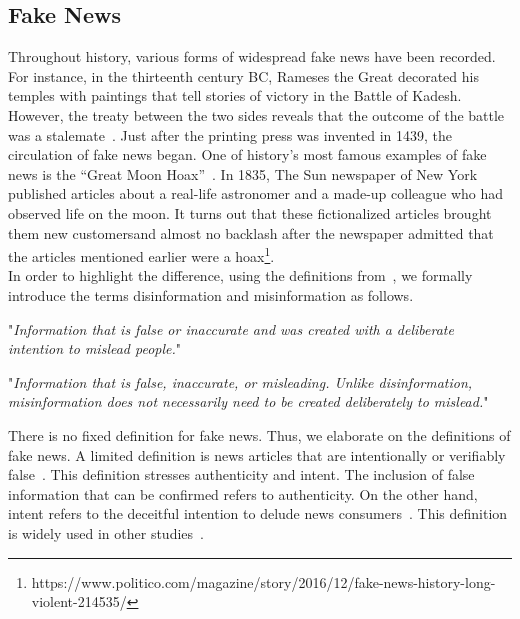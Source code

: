\subsection{Fake News}
\label{subsec:fakeNewsDetection_fakeNews}
Throughout history, various forms of widespread fake news have been recorded. For instance, in the thirteenth century BC, Rameses the Great decorated his temples with paintings that tell stories of victory in the Battle of Kadesh. However, the treaty between the two sides reveals
that the outcome of the battle was a stalemate~\parencite{HistorysGreatestLies_Weir}. Just after the printing press was invented in 1439,
the circulation of fake news began. One of history's most famous examples of fake news is the
“Great Moon Hoax”~\parencite{TheGreatMoonHoax_Foster}. In 1835, The Sun newspaper of New York published articles about a real-life astronomer and a made-up colleague who had observed life on the moon. It turns out that these fictionalized articles brought them new customersand almost no backlash after the newspaper admitted that the articles mentioned earlier
were a hoax\footnote{https://www.politico.com/magazine/story/2016/12/fake-news-history-long-violent-214535/}.\\
In order to highlight the difference, using the definitions from~\parencite{ThePsycologyOfFakeNews_Pennycook}, we formally introduce the terms disinformation and misinformation as follows.
\begin{definition}
    "\emph{Information that is false or inaccurate and was created with a deliberate intention to mislead people.}"~\parencite{ThePsycologyOfFakeNews_Pennycook}
\end{definition}
\begin{definition}
    "\emph{Information that is false, inaccurate, or misleading. Unlike disinformation, misinformation does not necessarily need to be created deliberately to mislead.}"~\parencite{ThePsycologyOfFakeNews_Pennycook}
\end{definition}
There is no fixed definition for fake news. Thus, we elaborate on the definitions of fake news. A limited definition is news articles that are intentionally or verifiably false~\parencite{SocialMediaAndFakeNewsIn2016Election_Allcott}. This definition stresses authenticity and intent. The inclusion of false information that can be confirmed refers to authenticity. On the other hand, intent refers to the deceitful intention to delude news consumers~\parencite{FakeNewsDetectionOnSocialMediaADataMiningPerspective_Shu}. This definition is widely used in other studies~\parencite{AutomaticDeceptionDetection_Conroy, TheFakeNewsSpreadingPlague_Mustafaraj, FakeNewsDetectionOnSocialMediaADataMiningPerspective_Shu}.
